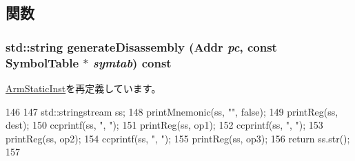 \subsection{関数}
\hypertarget{classArmISA_1_1DataX3RegOp_a95d323a22a5f07e14d6b4c9385a91896}{
\subsubsection[{generateDisassembly}]{\setlength{\rightskip}{0pt plus 5cm}std::string generateDisassembly ({\bf Addr} {\em pc}, \/  const SymbolTable $\ast$ {\em symtab}) const}}
\label{classArmISA_1_1DataX3RegOp_a95d323a22a5f07e14d6b4c9385a91896}


\hyperlink{classArmISA_1_1ArmStaticInst_a95d323a22a5f07e14d6b4c9385a91896}{ArmStaticInst}を再定義しています。


\begin{DoxyCode}
146 {
147     std::stringstream ss;
148     printMnemonic(ss, "", false);
149     printReg(ss, dest);
150     ccprintf(ss, ", ");
151     printReg(ss, op1);
152     ccprintf(ss, ", ");
153     printReg(ss, op2);
154     ccprintf(ss, ", ");
155     printReg(ss, op3);
156     return ss.str();
157 }
\end{DoxyCode}


